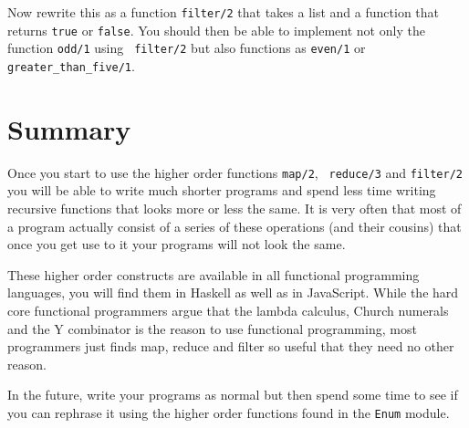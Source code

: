 \documentclass[a4paper,11pt]{article}
\begin{document}
Now rewrite this as a function {\tt filter/2} that takes a list and a
function that returns {\tt true} or {\tt false}. You should then be
able to implement not only the function {\tt odd/1} using {\tt
  filter/2} but also functions as {\tt even/1} or {\tt
  greater\_than\_five/1}.



\section*{Summary}

Once you start to use the higher order functions {\tt map/2}, {\tt
  reduce/3} and {\tt filter/2} you will be able to write much shorter
programs and spend less time writing recursive functions that looks
more or less the same. It is very often that most of a program actually
consist of a series of these operations (and their cousins) that once
you get use to it your programs will not look the same.

These higher order constructs are available in all functional
programming languages, you will find them in Haskell as well as in
JavaScript. While the hard core functional programmers argue that the
lambda calculus, Church numerals and the Y combinator is the reason to
use functional programming, most programmers just finds map, reduce and
filter so useful that they need no other reason.

In the future, write your programs as normal but then spend some time
to see if you can rephrase it using the higher order functions found
in the {\tt Enum} module.
\end{document}
